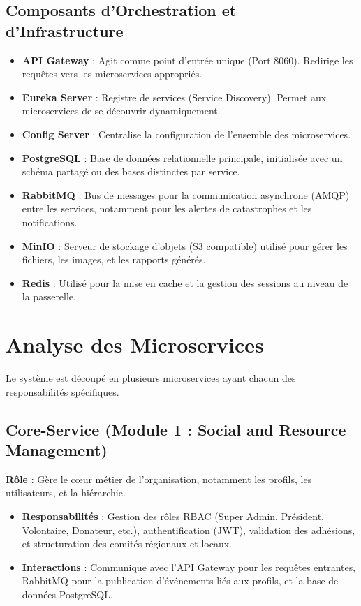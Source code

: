 \documentclass[12pt,a4paper]{report}
\begin{document}
\section{Composants d'Orchestration et d'Infrastructure}
\begin{itemize}
    \item \textbf{API Gateway} : Agit comme point d'entrée unique (Port 8060). Redirige les requêtes vers les microservices appropriés.
    \item \textbf{Eureka Server} : Registre de services (Service Discovery). Permet aux microservices de se découvrir dynamiquement.
    \item \textbf{Config Server} : Centralise la configuration de l'ensemble des microservices.
    \item \textbf{PostgreSQL} : Base de données relationnelle principale, initialisée avec un schéma partagé ou des bases distinctes par service.
    \item \textbf{RabbitMQ} : Bus de messages pour la communication asynchrone (AMQP) entre les services, notamment pour les alertes de catastrophes et les notifications.
    \item \textbf{MinIO} : Serveur de stockage d'objets (S3 compatible) utilisé pour gérer les fichiers, les images, et les rapports générés.
    \item \textbf{Redis} : Utilisé pour la mise en cache et la gestion des sessions au niveau de la passerelle.
\end{itemize}

\chapter{Analyse des Microservices}
Le système est découpé en plusieurs microservices ayant chacun des responsabilités spécifiques.

\section{Core-Service (Module 1 : Social and Resource Management)}
\textbf{Rôle} : Gère le cœur métier de l'organisation, notamment les profils, les utilisateurs, et la hiérarchie.
\begin{itemize}
    \item \textbf{Responsabilités} : Gestion des rôles RBAC (Super Admin, Président, Volontaire, Donateur, etc.), authentification (JWT), validation des adhésions, et structuration des comités régionaux et locaux.
    \item \textbf{Interactions} : Communique avec l'API Gateway pour les requêtes entrantes, RabbitMQ pour la publication d'événements liés aux profils, et la base de données PostgreSQL.
\end{itemize}
\end{document}
